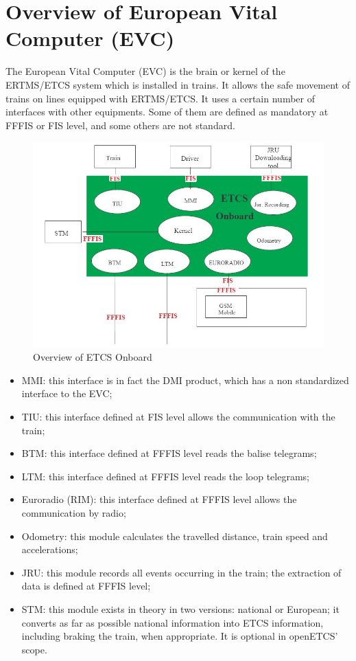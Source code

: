 \documentclass[nocc]{template/openetcs_report}
\begin{document}
\section{Overview of European Vital Computer (EVC)}
The European Vital Computer (EVC) is the brain or kernel of the ERTMS/ETCS system which is installed in trains. It allows the safe movement of trains on lines equipped with ERTMS/ETCS. It uses a certain number of interfaces with other equipments. Some of them are defined as mandatory at FFFIS or FIS level, and some others are not standard.
\begin{figure}[!h]
  \centering
  \includegraphics[width=\textwidth]{image/evc_overview}
  \caption{Overview of ETCS Onboard}
  \label{fig:Overview of ETCS Onboard}
\end{figure}
\begin{itemize}
\item MMI: this interface is in fact the DMI product, which has a non standardized interface to the EVC;
\item	TIU: this interface defined at FIS level allows the communication with the train;
\item	BTM: this interface defined at FFFIS level reads the balise telegrams;
\item	LTM: this interface defined at FFFIS level reads the loop telegrams;
\item	Euroradio (RIM): this interface defined at FFFIS level allows the communication by radio;
\item	Odometry: this module calculates the travelled distance, train speed and accelerations;
\item	JRU: this module records all events occurring in the train; the extraction of data is defined at FFFIS level;
\item	STM: this module exists in theory in two versions: national or European; it converts as far as possible national information into ETCS information, including braking the train, when appropriate. It is optional in openETCS' scope.
\end{itemize}
\end{document}
